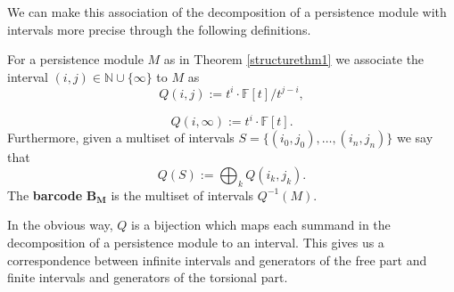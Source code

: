We can make this association of the decomposition of a persistence module with intervals more precise through the following definitions.

\begin{definition}
  For a persistence module $M$ as in Theorem \ref{structurethm1} we associate the interval $(i,j) \in \mathbb{N}\cup \{\infty\}$ to ${M}$ as
  \[Q(i,j):= t^{i} \cdot \mathbb{F}[t]/t^{{j-i}},\]

  \[Q(i,\infty):= t^{i} \cdot \mathbb{F}[t].\]
  Furthermore, given a multiset of intervals $S = \{(i_{0},j_{0}),\dots,(i_{n},j_{n})\}$ we say that
  \[Q(S) := \bigoplus_{k} Q(i_{k},j_{k}).\]
  The \textbf{barcode} $\mathbf{B_{M}}$ is the multiset of intervals $Q^{-1}(M)$.
\end{definition}


In the obvious way, $Q$ is a bijection which maps each summand in the decomposition of a persistence module to an interval. This gives us a correspondence between infinite intervals and generators of the free part and finite intervals and generators of the torsional part.


